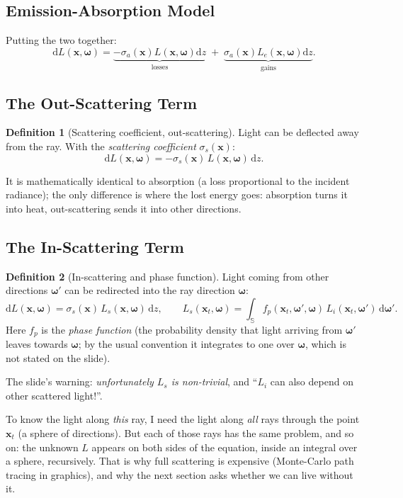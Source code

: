 \documentclass[11pt,a4paper]{article}
\newcommand{\Sph}{\mathbb{S}}
\newcommand{\dd}{\,\mathrm{d}}
\newcommand{\x}{{\bm{x}}}
\newcommand{\w}{{\bm{\omega}}}
\theoremstyle{definition}
\newtheorem{definition}{Definition}[section]
\theoremstyle{plain}
\theoremstyle{remark}
\begin{document}
\subsection{Emission-Absorption Model}

Putting the two together:
\[
\mathrm dL(\x,\w)=\underbrace{-\sigma_a(\x)L(\x,\w)\mathrm dz}_{\text{losses}}\;+\;\underbrace{\sigma_a(\x)L_e(\x,\w)\mathrm dz}_{\text{gains}} .
\]

\subsection{The Out-Scattering Term}

\begin{definition}[Scattering coefficient, out-scattering]\label{def:outscat}
Light can be deflected away from the ray. With the \emph{scattering coefficient} $\sigma_s(\x)$:
\[
\mathrm dL(\x,\w)=-\sigma_s(\x)\,L(\x,\w)\,\mathrm dz .
\]
\end{definition}
It is mathematically identical to absorption (a loss proportional to the incident radiance); the only difference is where the lost energy goes: absorption turns it into heat, out-scattering sends it into other directions.

\subsection{The In-Scattering Term}

\begin{definition}[In-scattering and phase function]\label{def:inscat}
Light coming from other directions $\w'$ can be redirected into the ray direction $\w$:
\[
\mathrm dL(\x,\w)=\sigma_s(\x)\,L_s(\x,\w)\,\mathrm dz,\qquad
L_s(\x_t,\w)=\int_{\Sph}f_p(\x_t,\w',\w)\,L_i(\x_t,\w')\dd\w' .
\]
Here $f_p$ is the \emph{phase function} (the probability density that light arriving from $\w'$ leaves towards $\w$; by the usual convention it integrates to one over $\w$, which is not stated on the slide).
\end{definition}

The slide's warning: \emph{unfortunately $L_s$ is non-trivial}, and ``$L_i$ can also depend on other scattered light!''.

\begin{intuition}
To know the light along \emph{this} ray, I need the light along \emph{all} rays through the point $\x_t$ (a sphere of directions). But each of those rays has the same problem, and so on: the unknown $L$ appears on both sides of the equation, inside an integral over a sphere, recursively. That is why full scattering is expensive (Monte-Carlo path tracing in graphics), and why the next section asks whether we can live without it.
\end{intuition}
\end{document}
